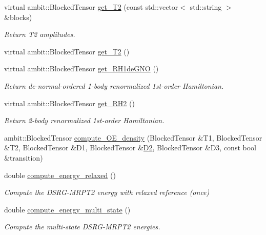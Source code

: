 \begin{DoxyCompactItemize}
virtual ambit\+::\+Blocked\+Tensor \mbox{\hyperlink{classforte_1_1_d_s_r_g___m_r_p_t2_a02e0b5b0716ac974c03b8ed5cef17980}{get\+\_\+\+T2}} (const std\+::vector$<$ std\+::string $>$ \&blocks)
\begin{DoxyCompactList}\small\item\em Return T2 amplitudes. \end{DoxyCompactList}\item 
virtual ambit\+::\+Blocked\+Tensor \mbox{\hyperlink{classforte_1_1_d_s_r_g___m_r_p_t2_af60895decfd8d368a6b61648b8f82310}{get\+\_\+\+T2}} ()
\item 
virtual ambit\+::\+Blocked\+Tensor \mbox{\hyperlink{classforte_1_1_d_s_r_g___m_r_p_t2_ab5efb73cb6a375af7f41822df5476036}{get\+\_\+\+R\+H1de\+G\+NO}} ()
\begin{DoxyCompactList}\small\item\em Return de-\/normal-\/ordered 1-\/body renormalized 1st-\/order Hamiltonian. \end{DoxyCompactList}\item 
virtual ambit\+::\+Blocked\+Tensor \mbox{\hyperlink{classforte_1_1_d_s_r_g___m_r_p_t2_a9384e3028a6648b40ae605261ce12db9}{get\+\_\+\+R\+H2}} ()
\begin{DoxyCompactList}\small\item\em Return 2-\/body renormalized 1st-\/order Hamiltonian. \end{DoxyCompactList}\item 
ambit\+::\+Blocked\+Tensor \mbox{\hyperlink{classforte_1_1_d_s_r_g___m_r_p_t2_aa443e71193020de0811daa881e1ce714}{compute\+\_\+\+O\+E\+\_\+density}} (Blocked\+Tensor \&T1, Blocked\+Tensor \&T2, Blocked\+Tensor \&D1, Blocked\+Tensor \&\mbox{\hyperlink{namespaceforte_abe00ec86d0015c0f2b6ac298c6e428e4ac4d62b6dcca08e5caf06c01889282859}{D2}}, Blocked\+Tensor \&D3, const bool \&transition)
\item 
double \mbox{\hyperlink{classforte_1_1_d_s_r_g___m_r_p_t2_ac39c70c4908ad51d315e46688efa13ab}{compute\+\_\+energy\+\_\+relaxed}} ()
\begin{DoxyCompactList}\small\item\em Compute the D\+S\+R\+G-\/\+M\+R\+P\+T2 energy with relaxed reference (once) \end{DoxyCompactList}\item 
double \mbox{\hyperlink{classforte_1_1_d_s_r_g___m_r_p_t2_af6d61f7450e104821153196e3c78c38b}{compute\+\_\+energy\+\_\+multi\+\_\+state}} ()
\begin{DoxyCompactList}\small\item\em Compute the multi-\/state D\+S\+R\+G-\/\+M\+R\+P\+T2 energies. \end{DoxyCompactList}\item 

\end{DoxyCompactItemize}
